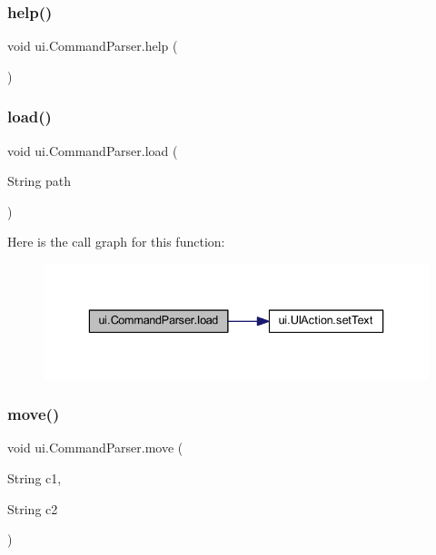\subsubsection{\texorpdfstring{help()}{help()}}
{\footnotesize\ttfamily void ui.\+Command\+Parser.\+help (\begin{DoxyParamCaption}{ }\end{DoxyParamCaption})\hspace{0.3cm}{\ttfamily [inline]}}

\mbox{\label{classui_1_1_command_parser_a2d11a803c2f103352b347cbc00cf49a9}} 
\subsubsection{\texorpdfstring{load()}{load()}}
{\footnotesize\ttfamily void ui.\+Command\+Parser.\+load (\begin{DoxyParamCaption}\item[{String}]{path }\end{DoxyParamCaption})\hspace{0.3cm}{\ttfamily [inline]}}

Here is the call graph for this function\+:
\nopagebreak
\begin{figure}[H]
\begin{center}
\leavevmode
\includegraphics[width=336pt]{classui_1_1_command_parser_a2d11a803c2f103352b347cbc00cf49a9_cgraph}
\end{center}
\end{figure}
\mbox{\label{classui_1_1_command_parser_a93c89e96a15062847ba74d20d21075e1}} 
\subsubsection{\texorpdfstring{move()}{move()}}
{\footnotesize\ttfamily void ui.\+Command\+Parser.\+move (\begin{DoxyParamCaption}\item[{String}]{c1,  }\item[{String}]{c2 }\end{DoxyParamCaption})\hspace{0.3cm}{\ttfamily [inline]}}

